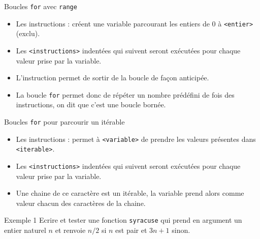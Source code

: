 \documentclass[10pt]{beamer}
\begin{document}
\begin{frame}[fragile]{\Ctitle}{\stitle}
	\begin{alertblock}{Boucles {\tt for} avec {\tt range}}
		\begin{itemize}
			\item<2-> Les instructions :
				créent une variable parcourant les entiers de 0 à {\tt <entier>} (exclu).
			\item<3-> Les {\tt <instructions>} indentées qui suivent seront exécutées pour chaque valeur prise par la variable.
			\item<4-> L'instruction  permet de sortir de la boucle de façon anticipée.
			\item<5-> La boucle {\tt for} permet donc de répéter un nombre prédéfini de fois des instructions, on dit que c'est une boucle bornée.
		\end{itemize}
	\end{alertblock}
\end{frame}


\begin{frame}[fragile]{\Ctitle}{\stitle}
	\begin{alertblock}{Boucles {\tt for} pour parcourir un itérable}
		\begin{itemize}
			\item<2-> Les instructions :
				permet à {\tt <variable>} de prendre les valeurs présentes dans {\tt <iterable>}.
			\item<3-> Les {\tt <instructions>} indentées qui suivent seront exécutées pour chaque valeur prise par la variable.
			\item<4-> Une chaine de ce caractère est un itérable, la variable prend alors comme valeur chacun des caractères de la chaine.
		\end{itemize}
	\end{alertblock}
\end{frame}

\begin{frame}[fragile]{\Ctitle}{\stitle}
	\begin{exampleblock}{Exemple 1}
		Ecrire et tester une fonction {\tt syracuse} qui prend en argument un entier naturel $n$ et renvoie $n/2$ si $n$ est pair et $3n+1$ sinon. \\
		\onslide<2->
	\end{exampleblock}
\end{frame}
\end{document}
